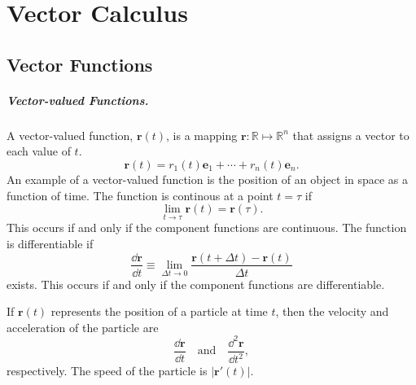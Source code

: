 
\flushbottom






\chapter{Vector Calculus}
\label{chapter_vector}






\section{Vector Functions}




\paragraph{Vector-valued Functions.}
A vector-valued function, $\mathbf{r}(t)$, is a mapping 
$\mathbf{r} : \mathbb{R} \mapsto \mathbb{R}^n$ that assigns a vector to each
value of $t$.
\[
\mathbf{r}(t) = r_1(t) \mathbf{e}_1 + \cdots + r_n(t) \mathbf{e}_n.
\]
An example of a vector-valued function is the position of an object in
space as a function of time.
The function is continous at a point $t = \tau$ if
\[
\lim_{t \to \tau} \mathbf{r}(t) = \mathbf{r}(\tau).
\]
This occurs if and only if the component functions are continuous.
The function is differentiable if
\[
\frac{\dd \mathbf{r}}{\dd t} \equiv \lim_{\Delta t \to 0} 
\frac{\mathbf{r}(t + \Delta t) - \mathbf{r}(t)}{\Delta t}
\]
exists.  This occurs if and only if the component functions are 
differentiable.

If $\mathbf{r}(t)$ represents the position of a particle at time $t$, then 
the velocity and acceleration of the particle are
\[
\frac{\dd \mathbf{r}}{\dd t} \quad \mathrm{and} \quad 
\frac{\dd^2 \mathbf{r}}{\dd t^2},
\]
respectively.  The speed of the particle is $|\mathbf{r}'(t)|$.





